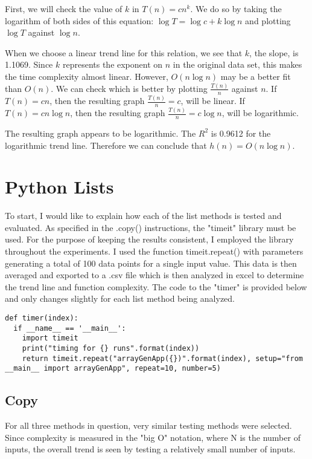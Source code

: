 \documentclass[12pt]{article}
\begin{document}
\noindent First, we will check the value of $k$ in $T(n) = cn^k$. We do so by taking the logarithm of both sides of this equation: $\log{T}=\log{c}+k\log{n}$ and plotting $\log{T}$ against $\log{n}$. 


\noindent When we choose a linear trend line for this relation, we see that $k$, the slope, is 1.1069. Since $k$ represents the exponent on $n$ in the original data set, this makes the time complexity almost linear. However, $O(n\log{n})$ may be a better fit than $O(n)$. We can check which is better by plotting $\frac{T(n)}{n}$ against $n$. If $T(n) = cn$, then the resulting graph $\frac{T(n)}{n} = c$, will be linear. If $T(n) = cn\log{n}$, then the resulting graph $\frac{T(n)}{n} = c\log{n}$, will be logarithmic.


\noindent The resulting graph appears to be logarithmic. The $R^2$ is 0.9612 for the logarithmic trend line. Therefore we can conclude that $h(n) = O(n\log{n})$.

\section{Python Lists}

To start, I would like to explain how each of the list methods is tested and evaluated. As specified in the .copy() instructions, the "timeit" library must be used. For the purpose of keeping the results consistent, I employed the library throughout the experiments. I used the function timeit.repeat() with parameters generating a total of 100 data points for a single input value. This data is then averaged and exported to a .csv file which is then analyzed in excel to determine the trend line and function complexity. The code to the "timer" is provided below and only changes slightly for each list method being analyzed.
\scriptsize
\begin{verbatim}
def timer(index):
  if __name__ == '__main__':
    import timeit
    print("timing for {} runs".format(index))
    return timeit.repeat("arrayGenApp({})".format(index), setup="from __main__ import arrayGenApp", repeat=10, number=5)
\end{verbatim}
\normalsize

\subsection{Copy}
For all three methods in question, very similar testing methods were selected. Since complexity is measured in the "big O" notation, where N is the number of inputs, the overall trend is seen by testing a relatively small number of inputs. 
\end{document}

